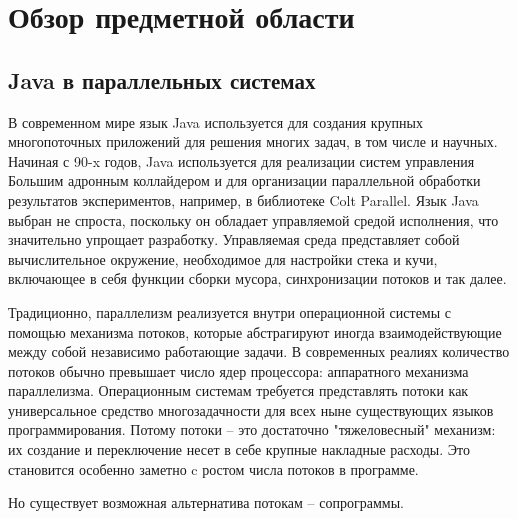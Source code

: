 \section{Обзор предметной области}
	\subsection{Java в параллельных системах}
	В современном мире язык Java используется для создания крупных многопоточных приложений 
	для решения многих задач, в том числе и научных. Начиная с 90-x годов, Java используется для реализации
	систем управления Большим адронным коллайдером и для организации параллельной обработки результатов 
	экспериментов, например, в библиотеке Colt Parallel\cite{colt}. Язык Java выбран не спроста, поскольку
	он обладает управляемой средой исполнения, что значительно упрощает разработку. Управляемая среда представляет
	собой вычислительное окружение, необходимое для настройки стека и кучи, включающее в себя функции сборки мусора,
	синхронизации потоков и так далее.
	\par
	Традиционно, параллелизм реализуется внутри операционной системы с помощью механизма потоков, 
	которые абстрагируют иногда взаимодействующие между собой независимо работающие задачи. 
	В современных реалиях количество потоков обычно превышает число ядер процессора: 
	аппаратного механизма параллелизма. Операционным системам требуется представлять потоки
	как универсальное средство многозадачности для всех ныне существующих языков программирования. Потому потоки 
	-- это достаточно "тяжеловесный" механизм: их создание и переключение несет в себе крупные накладные расходы. 
	Это становится особенно заметно c ростом числа потоков в программе. 
	\par
	Но существует возможная альтернатива потокам -- сопрограммы.
	
